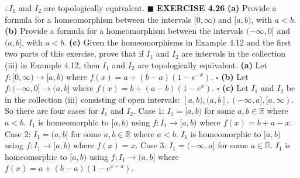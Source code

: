 \documentclass[12pt]{article}
\begin{document}
\newline
\(\therefore I_1\) and \(I_2\) are topologically equivalent.
\newline \(\blacksquare\)
\newpage
\noindent
\textbf{EXERCISE 4.26}
\newline
\textbf{(a)} Provide a formula for a homeomorphism between the intervals \([0, \infty)\) and \([a,b)\), with \(a<b\).
\newline
\textbf{(b)} Provide a formula for a homeomorphism between the intervals \((-\infty, 0]\) and \((a,b]\), with \(a<b\).
\newline
\textbf{(c)} Given the homeomorphisms in Example 4.12 and the first two parts of this exercise, prove that if \(I_1\) and \(I_2\) are intervals in the collection (iii) in Example 4.12, then \(I_1\) and \(I_2\) are topologically equivalent.
\newline
\newline
\textbf{(a)} Let \(f:[0,\infty) \rightarrow [a,b)\) where \(f(x) = a + (b-a)(1-e^{-x})\).
\newline \(\square\) \newline
\textbf{(b)} Let \(f:(-\infty, 0] \rightarrow (a,b]\) where \(f(x) = b + (a-b)(1-e^x)\).
\newline \(\square\) \newline
\textbf{(c)} Let \(I_1\) and \(I_2\) be in the collection (iii) consisting of open intervals: \([a,b), (a,b], (-\infty,a], [a,\infty)\).
\newline
So there are four cases for \(I_1\) and \(I_2\).
\newline \newline
Case 1: \(I_1 = [a,b)\) for some \(a,b\in \mathbb{R}\) where \(a<b\).
\newline
\(I_1\) is homeomorphic to \([a,b)\) using
\newline
\(f:I_1\rightarrow [a,b)\) where \(f(x) = b+a-x\).
\newline \newline
Case 2: \(I_1 = (a,b]\) for some \(a,b\in\mathbb{R}\) where \(a<b\).
\newline
\(I_1\) is homeomorphic to \([a,b)\) using
\newline
\(f:I_1 \rightarrow [a,b)\) where \(f(x) = x\).
\newline \newline
Case 3: \(I_1 = (-\infty,a]\) for some \(a \in \mathbb{R}\).
\newline
\(I_1\) is homeomorphic to \([a,b)\) using
\newline
\(f:I_1 \rightarrow (a,b]\) where \(f(x) = a+(b-a)(1-e^{x-a})\).
\end{document}

